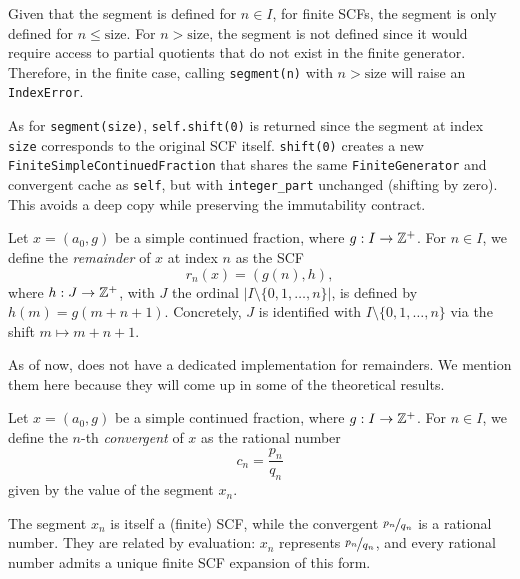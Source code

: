 \begin{remark}
    Given that the segment is defined for $n \in I$, for finite SCFs, the segment is only defined 
    for $n \leq \text{size}$. For $n > \text{size}$, the segment is not defined since it would 
    require access to partial quotients that do not exist in the finite generator. Therefore, 
    in the finite case, calling \texttt{segment(n)} with $n > \text{size}$ will raise an \texttt{IndexError}.

    As for \texttt{segment(size)}, \texttt{self.shift(0)} is returned since the segment at
    index \texttt{size} corresponds to the original SCF itself.  \texttt{shift(0)} creates a
    new \texttt{FiniteSimpleContinuedFraction} that shares the same \texttt{FiniteGenerator}
    and convergent cache as \texttt{self}, but with \texttt{integer\_part} unchanged (shifting
    by zero).  This avoids a deep copy while preserving the immutability contract.
\end{remark}

\begin{definition}[Remainder]
    Let $x = (a_0, g)$ be a simple continued fraction, where $g: I \to \mathbb{Z}^+$. 
    For $n \in I$, we define the \textit{remainder} of $x$ at index $n$ as the SCF
    \[
        r_n(x) = (g(n), h),
    \]
    where $h: J \to \mathbb{Z}^+$, with $J$ the ordinal $|I \setminus \{0,1,\ldots,n\}|$, is
    defined by $h(m) = g(m + n + 1)$.  Concretely, $J$ is identified with
    $I \setminus \{0, 1, \ldots, n\}$ via the shift $m \mapsto m + n + 1$.
\end{definition}

\begin{remark}
    As of now, \catena does not have a dedicated implementation for remainders. We mention them 
    here because they will come up in some of the theoretical results.
\end{remark}

\begin{definition}[Convergent]
    Let $x = (a_0, g)$ be a simple continued fraction, where $g: I \to \mathbb{Z}^+$. 
    For $n \in I$, we define the $n$-th \textit{convergent} of $x$ as the rational number
    \[
        c_n = \frac{p_n}{q_n}
    \]
    given by the value of the segment $x_n$.
\end{definition}

\begin{remark}
    The segment $x_n$ is itself a (finite) SCF, while the convergent $\nicefrac{p_n}{q_n}$ 
    is a rational number. They are related by evaluation: $x_n$ represents 
    $\nicefrac{p_n}{q_n}$, and every rational number admits a unique finite SCF expansion 
    of this form.
\end{remark}

